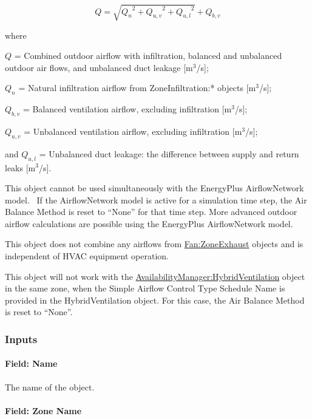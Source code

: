 \begin{equation}
Q = \sqrt {{Q_n}^2 + {Q_{u,v}}^2 + {Q_{u,l}}^2}  + {Q_{b,v}}
\end{equation}

where

$Q$ = Combined outdoor airflow with infiltration, balanced and unbalanced outdoor air flows, and unbalanced duct leakage {[}m\(^{3}\)/s{]};

$Q_{n}$ = Natural infiltration airflow from ZoneInfiltration:* objects {[}m\(^{3}\)/s{]};

$Q_{b,v}$ = Balanced ventilation airflow, excluding infiltration {[}m\(^{3}\)/s{]};

$Q_{u,v}$ = Unbalanced ventilation airflow, excluding infiltration {[}m\(^{3}\)/s{]};

and $Q_{u,l}$ = Unbalanced duct leakage: the difference between supply and return leaks {[}m\(^{3}\)/s{]}.

This object cannot be used simultaneously with the EnergyPlus AirflowNetwork model.~ If the AirflowNetwork model is active for a simulation time step, the Air Balance Method is reset to ``None'' for that time step. More advanced outdoor airflow calculations are possible using the EnergyPlus AirflowNetwork model.

This object does not combine any airflows from \hyperref[fanzoneexhaust]{Fan:ZoneExhaust} objects and is independent of HVAC equipment operation.

This object will not work with the \hyperref[availabilitymanagerhybridventilation]{AvailabilityManager:HybridVentilation} object in the same zone, when the Simple Airflow Control Type Schedule Name is provided in the HybridVentilation object. For this case, the Air Balance Method is reset to ``None''.

\subsubsection{Inputs}\label{inputs-4-004}

\paragraph{Field: Name}\label{field-name-4-004}

The name of the object.

\paragraph{Field: Zone Name}\label{field-zone-name-2}


